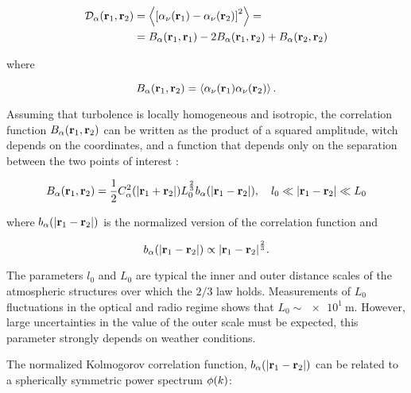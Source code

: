 \begin{equation}
        \begin{split}
                \mathcal{D}_\alpha\qty(\vb{r}_1,\vb{r}_2) & =
                \expval{\qty[\alpha_\nu\qty(\vb{r}_1) -
                \alpha_\nu\qty(\vb{r}_2)]^2} =
                \\
                & = B_\alpha\qty(\vb{r}_1,\vb{r}_1) -
                2B_\alpha\qty(\vb{r}_1,\vb{r}_2) + B_\alpha\qty(\vb{r}_2,\vb{r}_2)
        \end{split}
\end{equation}

where

\begin{equation}
        B_\alpha\qty(\vb{r}_1,\vb{r}_2) =
        \expval{\alpha_\nu\qty(\vb{r}_1)\alpha_\nu\qty(\vb{r}_2)}.
\end{equation}

Assuming that turbolence is locally homogeneous and isotropic, the correlation
function $B_\alpha\qty(\vb{r}_1,\vb{r}_2)$ can be written as the product of
a squared amplitude, witch depends on the coordinates, and a function that
depends only on the separation between the two points of interest
\autocite{tatarski2016wave}:

\begin{equation}
        B_\alpha\qty(\vb{r}_1,\vb{r}_2) = \frac{1}{2}
        C^2_\alpha\qty(\abs{\vb{r}_1 + \vb{r}_2})
        L^{\frac{2}{3}}_0 b_\alpha\qty(\abs{\vb{r}_1 - \vb{r}_2}),\quad
        l_0 \ll \abs{\vb{r}_1 - \vb{r}_2} \ll L_0
\end{equation}

where $b_\alpha\qty(\abs{\vb{r}_1 - \vb{r}_2})$ is the normalized version
of the correlation function and

\begin{equation}
        b_\alpha\qty(\abs{\vb{r}_1 - \vb{r}_2}) \propto
        \abs{\vb{r}_1 - \vb{r}_2}^\frac{2}{3}.
\end{equation}

The parameters $l_0$ and $L_0$ are typical the inner and outer distance
scales of the atmospheric structures over which the $2/3$ law holds.
Measurements of $L_0$ fluctuations in the optical and radio regime shows
that $L_0 \sim \SI{e1}{\meter}$. However, large uncertainties in the value
of the outer scale must be expected, this parameter strongly
depends on weather conditions.

The normalized Kolmogorov correlation function, $b_\alpha\qty(\abs{\vb{r}_1 - \vb{r}_2})$ can be related to a
spherically symmetric power spectrum $\phi\qty(k)$:

